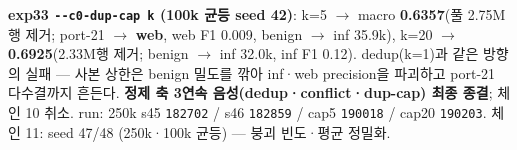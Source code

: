 \textbf{exp33 \texttt{-\allowbreak{}-\allowbreak{}c0-\allowbreak{}dup\allowbreak{}-\allowbreak{}cap k} (100k 균등 seed 42)}: k=\allowbreak{}5  \ensuremath{\rightarrow}  macro \textbf{0.6357}(풀 2.75M행 제거; port-21 \ensuremath{\rightarrow} \textbf{web}, web F1 0.009, benign \ensuremath{\rightarrow} inf 35.9k), k=\allowbreak{}20  \ensuremath{\rightarrow}  \textbf{0.6925}(2.33M행 제거; benign \ensuremath{\rightarrow} inf 32.0k, inf F1 0.12). dedup(k=\allowbreak{}1)과 같은 방향의 실패 — 사본 상한은 benign 밀도를 깎아 inf·web precision을 파괴하고 port-21 다수결까지 흔든다. \textbf{정제 축 3연속 음성(dedup·conflict·dup-cap) 최종 종결}; 체인 10 취소. run: 250k s45 \texttt{182702} /\allowbreak{} s46 \texttt{182859} /\allowbreak{} cap5 \texttt{190018} /\allowbreak{} cap20 \texttt{190203}. 체인 11: seed 47/\allowbreak{}48 (250k·100k 균등) — 붕괴 빈도·평균 정밀화.

